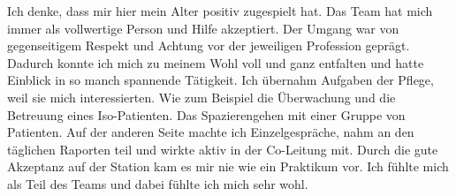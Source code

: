 Ich denke, dass mir hier mein Alter positiv zugespielt hat. Das Team hat mich immer als vollwertige Person und Hilfe akzeptiert. Der Umgang war von gegenseitigem Respekt und Achtung vor der jeweiligen Profession geprägt. Dadurch konnte ich mich zu meinem Wohl voll und ganz entfalten und hatte Einblick in so manch spannende Tätigkeit. Ich übernahm Aufgaben der Pflege, weil sie mich interessierten. Wie zum Beispiel die Überwachung und die Betreuung eines Iso-Patienten. Das Spazierengehen mit einer Gruppe von Patienten. Auf der anderen Seite machte ich Einzelgespräche, nahm an den täglichen Raporten teil und wirkte aktiv in der Co-Leitung mit. Durch die gute Akzeptanz auf der Station kam es mir nie wie ein Praktikum vor. Ich fühlte mich als Teil des Teams und dabei fühlte ich mich sehr wohl.  
